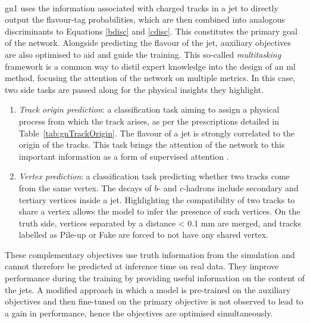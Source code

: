 \paragraph{}\gls{gn1} uses the information associated with charged tracks in a jet to directly output the flavour-tag probabilities, which are then combined into analogous discriminants to Equations \ref{bdisc} and \ref{cdisc}. This constitutes the primary goal of the network. Alongside predicting the flavour of the jet, auxiliary objectives are also optimised to aid and guide the training. This so-called \textit{multitasking} framework is a common way to distil expert knowledge into the design of an \gls{ml} method, focusing the attention of the network on multiple metrics. In this case, two side tasks are passed along for the physical insights they highlight.
\begin{enumerate}
\item \textit{Track origin prediction}: a classification task aiming to assign a physical process from which the track arises, as per the prescriptions detailed in Table~\ref{tab:gnTrackOrigin}. The flavour of a jet is strongly correlated to the origin of the tracks. This task brings the attention of the network to this important information as a form of supervised attention \cite{hwang2021selfsupervised}.
\item \textit{Vertex prediction}: a classification task predicting whether two tracks come from the same vertex. The decays of $b$- and $c$-hadrons include secondary and tertiary vertices inside a jet. Highlighting the compatibility of two tracks to share a vertex allows the model to infer the presence of such vertices. On the truth side, vertices separated by a distance < 0.1 mm are merged, and tracks labelled as Pile-up or Fake are forced to not have any shared vertex.
\end{enumerate}
These complementary objectives use truth information from the simulation and cannot therefore be predicted at inference time on real data. They improve performance during the training by providing useful information on the content of the jets. A modified approach in which a model is pre-trained on the auxiliary objectives and then fine-tuned on the primary objective is not observed to lead to a gain in performance, hence the objectives are optimised simultaneously. \\

